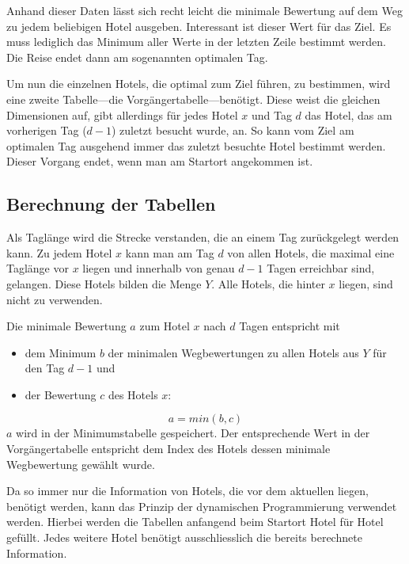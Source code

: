 \documentclass[a4paper,10pt,ngerman]{scrartcl}
\begin{document}
Anhand dieser Daten lässt sich recht leicht die minimale Bewertung auf dem Weg zu jedem beliebigen Hotel ausgeben.
Interessant ist dieser Wert für das Ziel.
Es muss lediglich das Minimum aller Werte in der letzten Zeile bestimmt werden.
Die Reise endet dann am sogenannten optimalen Tag.

Um nun die einzelnen Hotels, die optimal zum Ziel führen, zu bestimmen, wird eine zweite Tabelle---die Vorgängertabelle---benötigt.
Diese weist die gleichen Dimensionen auf, gibt allerdings für jedes Hotel $x$ und Tag $d$ das Hotel, das am vorherigen Tag ($d-1$) zuletzt besucht wurde, an.
So kann vom Ziel am optimalen Tag ausgehend immer das zuletzt besuchte Hotel bestimmt werden.
Dieser Vorgang endet, wenn man am Startort angekommen ist.

\subsection{Berechnung der Tabellen}
Als Taglänge wird die Strecke verstanden, die an einem Tag zurückgelegt werden kann.
Zu jedem Hotel $x$ kann man am Tag $d$ von allen Hotels, die maximal eine Taglänge vor $x$ liegen und innerhalb von genau $d-1$ Tagen erreichbar sind, gelangen.
Diese Hotels bilden die Menge $Y$.
Alle Hotels, die hinter $x$ liegen, sind nicht zu verwenden.

Die minimale Bewertung $a$ zum Hotel $x$ nach $d$ Tagen entspricht mit
\begin{itemize}
    \item dem Minimum $b$ der minimalen Wegbewertungen zu allen Hotels aus $Y$ für den Tag $d-1$ und
    \item der Bewertung $c$ des Hotels $x$:
\end{itemize}
\begin{equation*}
    a = min(b, c)
\end{equation*}
$a$ wird in der Minimumstabelle gespeichert.
Der entsprechende Wert in der Vorgängertabelle entspricht dem Index des Hotels dessen minimale Wegbewertung gewählt wurde.

\medskip
Da so immer nur die Information von Hotels, die vor dem aktuellen liegen, benötigt werden, kann das Prinzip der dynamischen Programmierung verwendet werden.
Hierbei werden die Tabellen anfangend beim Startort Hotel für Hotel gefüllt.
Jedes weitere Hotel benötigt ausschliesslich die bereits berechnete Information.
\end{document}
